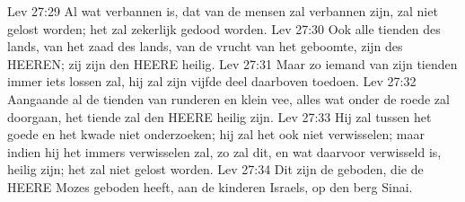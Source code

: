 Lev 27:29  Al wat verbannen is, dat van de mensen zal verbannen zijn, zal niet gelost worden; het zal zekerlijk gedood worden.
Lev 27:30  Ook alle tienden des lands, van het zaad des lands, van de vrucht van het geboomte, zijn des HEEREN; zij zijn den HEERE heilig.
Lev 27:31  Maar zo iemand van zijn tienden immer iets lossen zal, hij zal zijn vijfde deel daarboven toedoen.
Lev 27:32  Aangaande al de tienden van runderen en klein vee, alles wat onder de roede zal doorgaan, het tiende zal den HEERE heilig zijn.
Lev 27:33  Hij zal tussen het goede en het kwade niet onderzoeken; hij zal het ook niet verwisselen; maar indien hij het immers verwisselen zal, zo zal dit, en wat daarvoor verwisseld is, heilig zijn; het zal niet gelost worden.
Lev 27:34  Dit zijn de geboden, die de HEERE Mozes geboden heeft, aan de kinderen Israels, op den berg Sinai.



